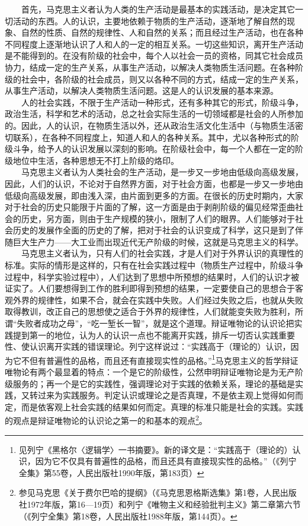 \documentclass[cn,11pt,chinese]{elegantbook}
\begin{document}
　　首先，马克思主义者认为人类的生产活动是最基本的实践活动，是决定其它一切活动的东西。人的认识，主要地依赖于物质的生产活动，逐渐地了解自然的现象、自然的性质、自然的规律性、人和自然的关系；而且经过生产活动，也在各种不同程度上逐渐地认识了人和人的一定的相互关系。一切这些知识，离开生产活动是不能得到的。在没有阶级的社会中，每个人以社会一员的资格，同其它社会成员协力，结成一定的生产关系，从事生产活动，以解决人类物质生活问题。在各种阶级的社会中，各阶级的社会成员，则又以各种不同的方式，结成一定的生产关系，从事生产活动，以解决人类物质生活问题。这是人的认识发展的基本来源。\\
　　人的社会实践，不限于生产活动一种形式，还有多种其它的形式，阶级斗争，政治生活，科学和艺术的活动，总之社会实际生活的一切领域都是社会的人所参加的。因此，人的认识，在物质生活以外，还从政治生活文化生活中（与物质生活密切联系），在各种不同程度上，知道人和人的各种关系。其中，尤以各种形式的阶级斗争，给予人的认识发展以深刻的影响。在阶级社会中，每一个人都在一定的阶级地位中生活，各种思想无不打上阶级的烙印。\\
　　马克思主义者认为人类社会的生产活动，是一步又一步地由低级向高级发展，因此，人们的认识，不论对于自然界方面，对于社会方面，也都是一步又一步地由低级向高级发展，即由浅入深，由片面到更多的方面。在很长的历史时期内，大家对于社会的历史只能限于片面的了解，这一方面是由于剥削阶级的偏见经常歪曲社会的历史，另方面，则由于生产规模的狭小，限制了人们的眼界。人们能够对于社会历史的发展作全面的历史的了解，把对于社会的认识变成了科学，这只是到了伴随巨大生产力——大工业而出现近代无产阶级的时候，这就是马克思主义的科学。\\
　　马克思主义者认为，只有人们的社会实践，才是人们对于外界认识的真理性的标准。实际的情形是这样的，只有在社会实践过程中（物质生产过程中，阶级斗争过程中，科学实验过程中），人们达到了思想中所预想的结果时，人们的认识才被证实了。人们要想得到工作的胜利即得到预想的结果，一定要使自己的思想合于客观外界的规律性，如果不合，就会在实践中失败。人们经过失败之后，也就从失败取得教训，改正自己的思想使之适合于外界的规律性，人们就能变失败为胜利，所谓“失败者成功之母”，“吃一堑长一智”，就是这个道理。辩证唯物论的认识论把实践提到第一的地位，认为人的认识一点也不能离开实践，排斥一切否认实践重要性、使认识离开实践的错误理论。列宁这样说过：“实践高于（理论的）认识，因为它不但有普遍性的品格，而且还有直接现实性的品格。”\footnote[1]{ 见列宁《黑格尔〈逻辑学〉一书摘要》。新的译文是：“实践高于（理论的）认识，因为它不仅具有普遍性的品格，而且还具有直接现实性的品格。”（《列宁全集》第55卷，人民出版社1990年版，第183页）}马克思主义的哲学辩证唯物论有两个最显着的特点：一个是它的阶级性，公然申明辩证唯物论是为无产阶级服务的；再一个是它的实践性，强调理论对于实践的依赖关系，理论的基础是实践，又转过来为实践服务。判定认识或理论之是否真理，不是依主观上觉得如何而定，而是依客观上社会实践的结果如何而定。真理的标准只能是社会的实践。实践的观点是辩证唯物论的认识论之第一的和基本的观点\footnote[2]{ 参见马克思《关于费尔巴哈的提纲》（《马克思恩格斯选集》第1卷，人民出版社1972年版，第16—19页）和列宁《唯物主义和经验批判主义》第二章第六节（《列宁全集》第18卷，人民出版社1988年版，第144页）。}。\\
\end{document}
